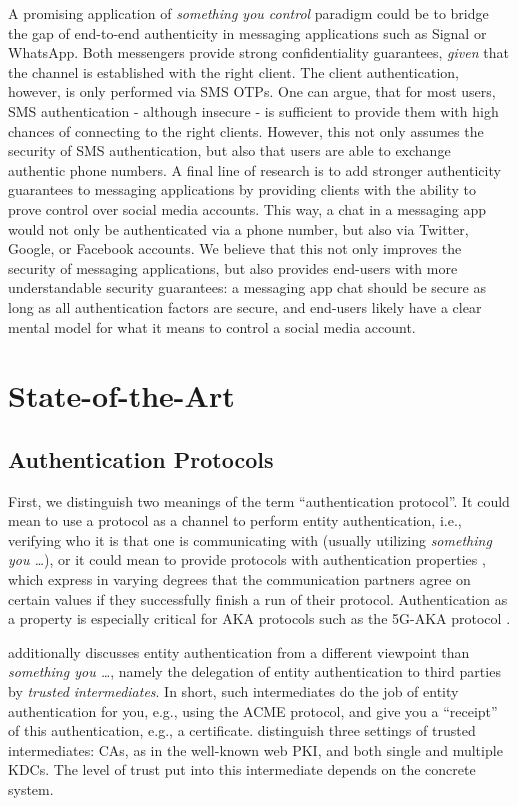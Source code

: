 \documentclass{article}
\begin{document}
A promising application of \textit{something you control} paradigm could be to bridge the gap of end-to-end authenticity in messaging applications such as Signal or WhatsApp.
Both messengers provide strong confidentiality guarantees, \textit{given} that the channel is established with the right client.
The client authentication, however, is only performed via SMS \glspl{OTP}.
One can argue, that for most users, SMS authentication - although insecure \cite{SMSAuthInsecure} - is sufficient to provide them with high chances of connecting to the right clients.
However, this not only assumes the security of SMS authentication, but also that users are able to exchange authentic phone numbers.
A final line of research is to add stronger authenticity guarantees to messaging applications by providing clients with the ability to prove control over social media accounts.
This way, a chat in a messaging app would not only be authenticated via a phone number, but also via Twitter, Google, or Facebook accounts.
We believe that this not only improves the security of messaging applications, but also provides end-users with more understandable security guarantees: a messaging app chat should be secure as long as all authentication factors are secure, and end-users likely have a clear mental model for what it means to control a social media account.

\section{State-of-the-Art}

\subsection{Authentication Protocols}
\label{sec:auth-protocols}

First, we distinguish two meanings of the term ``authentication protocol''.
It could mean to use a protocol as a channel to perform entity authentication, i.e., verifying who it is that one is communicating with (usually utilizing \textit{something you \dots}), or it could mean to provide protocols with authentication properties \cite{AuthenticationSpec}, which express in varying degrees that the communication partners agree on certain values if they successfully finish a run of their protocol.
Authentication as a property is especially critical for \gls{AKA} protocols such as the 5G-\gls{AKA} protocol \cite{5GSpec}.

\citeauthor{NetworkSecurityBook} \cite{NetworkSecurityBook} additionally discusses entity authentication from a different viewpoint than \textit{something you \dots}, namely the delegation of entity authentication to third parties by \textit{trusted intermediates}.
In short, such intermediates do the job of entity authentication for you, e.g., using the \gls{ACME} protocol, and give you a ``receipt'' of this authentication, e.g., a certificate.
\citeauthor{NetworkSecurityBook} distinguish three settings of trusted intermediates: \glspl{CA}, as in the well-known web \gls{PKI}, and both single and multiple \glspl{KDC}.
The level of trust put into this intermediate depends on the concrete system.
\end{document}
